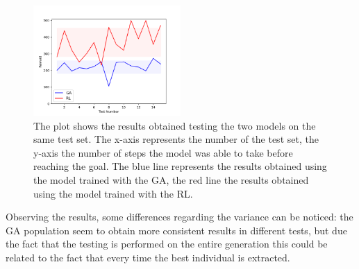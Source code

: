 \begin{figure}[H]
	\centering
	\includegraphics [width=0.5\textwidth]{Images/RL_vs_GA.png}
	\caption{The plot shows the results obtained testing the two models on the same test set. The x-axis represents the number of the test set, the y-axis the number of steps the model was able to take before reaching the goal. The blue line represents the results obtained using the model trained with the GA, the red line the results obtained using the model trained with the RL.}
	\label{figRLvsGA}
\end{figure}

Observing the results, some differences regarding the variance can be noticed: the GA population seem to obtain more consistent results in different tests, but due the fact that the testing is performed on the entire generation this could be related to the fact that every time the best individual is extracted.\\


	






